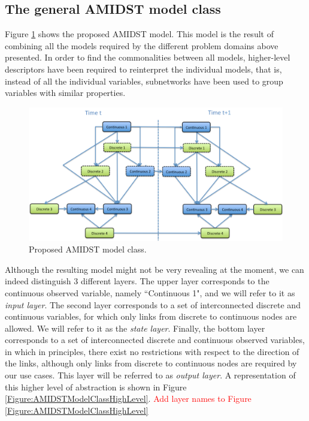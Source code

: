 \subsection{The general AMIDST model class}

Figure \ref{Figure:AMIDSTModelClass} shows the proposed AMIDST model. This model is the result of combining all the models required by the different problem domains above presented. In order to find the commonalities between all models, higher-level descriptors have been required to reinterpret the individual models, that is, instead of all the individual variables, subnetworks have been used to group variables with similar properties.


\begin{figure}[ht!]
\begin{center}
\includegraphics[scale=0.39]{./figures/AMIDSTModelClass}
\caption{\label{Figure:AMIDSTModelClass} Proposed AMIDST model class.}
\end{center}
\end{figure}


Although the resulting model might not be very revealing at the moment, we can indeed distinguish 3 different layers. The upper layer corresponds to the continuous observed variable, namely ``Continuous 1", and we will refer to it as \textit{input layer}. The second layer corresponds to a set of interconnected discrete and continuous variables, for which only links from discrete to continuous nodes are allowed. We will refer to it as the \textit{state layer}. Finally, the bottom layer corresponds to a set of interconnected discrete and continuous observed variables, in which in principles, there exist no restrictions with respect to the direction of the links, although only links from discrete to continuous nodes are required by our use cases. This layer will be referred to as \textit{output layer}. A representation of this higher level of abstraction is shown in Figure \ref{Figure:AMIDSTModelClassHighLevel}. \textcolor{red}{Add layer names to Figure \ref{Figure:AMIDSTModelClassHighLevel}}

